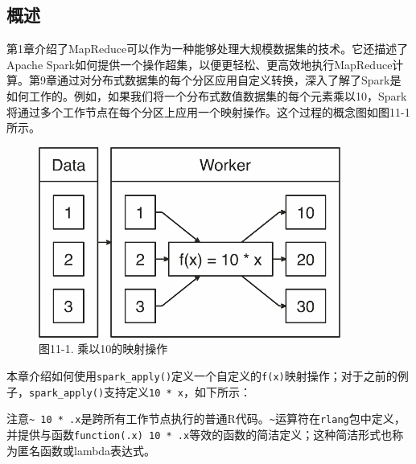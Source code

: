 \documentclass[
]{article}
\newenvironment{Shaded}{\begin{snugshade}}{\end{snugshade}}
\newcommand{\CommentTok}[1]{\textcolor[rgb]{0.56,0.35,0.01}{\textit{#1}}}
\newcommand{\DecValTok}[1]{\textcolor[rgb]{0.00,0.00,0.81}{#1}}
\newcommand{\ErrorTok}[1]{\textcolor[rgb]{0.64,0.00,0.00}{\textbf{#1}}}
\newcommand{\KeywordTok}[1]{\textcolor[rgb]{0.13,0.29,0.53}{\textbf{#1}}}
\newcommand{\NormalTok}[1]{#1}
\newcommand{\OperatorTok}[1]{\textcolor[rgb]{0.81,0.36,0.00}{\textbf{#1}}}
\newcommand{\StringTok}[1]{\textcolor[rgb]{0.31,0.60,0.02}{#1}}
\begin{document}
\hypertarget{ux6982ux8ff0-10}{%
\subsection{概述}\label{ux6982ux8ff0-10}}

第1章介绍了MapReduce可以作为一种能够处理大规模数据集的技术。它还描述了Apache
Spark如何提供一个操作超集，以便更轻松、更高效地执行MapReduce计算。第9章通过对分布式数据集的每个分区应用自定义转换，深入了解了Spark是如何工作的。例如，如果我们将一个分布式数值数据集的每个元素乘以10，Spark将通过多个工作节点在每个分区上应用一个映射操作。这个过程的概念图如图11-1所示。

\begin{figure}
\centering
\includegraphics{figures/11_1.png}
\caption{图11-1. 乘以10的映射操作}
\end{figure}

本章介绍如何使用\texttt{spark\_apply()}定义一个自定义的\texttt{f(x)}映射操作；对于之前的例子，\texttt{spark\_apply()}支持定义\texttt{10\ *\ x}，如下所示：

\begin{Shaded}
\end{Shaded}

注意\texttt{\textasciitilde{}\ 10\ *\ .x}是跨所有工作节点执行的普通R代码。\texttt{\textasciitilde{}}运算符在\texttt{rlang}包中定义，并提供与函数\texttt{function(.x)\ 10\ *\ .x}等效的函数的简洁定义；这种简洁形式也称为匿名函数或lambda表达式。
\end{document}
